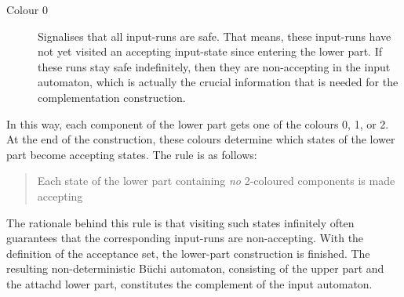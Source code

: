 {\begin{description}


\item[Colour 0]
Signalises that all input-runs are safe. That means, these input-runs have not yet visited an accepting input-state since entering the lower part. If these runs stay safe indefinitely, then they are non-accepting in the input automaton, which is actually the crucial information that is needed for the complementation construction.
\end{description}}

In this way, each component of the lower part gets one of the colours 0, 1, or 2. At the end of the construction, these colours determine which states of the lower part become accepting states. The rule is as follows:

\begin{quote}
\centering
Each state of the lower part containing \textit{no} 2-coloured components is made accepting
\end{quote}

The rationale behind this rule is that visiting such states infinitely often guarantees that the corresponding input-runs are non-accepting. With the definition of the acceptance set, the lower-part construction is finished. The resulting non-deterministic Büchi automaton, consisting of the upper part and the attachd lower part, constitutes the complement of the input automaton.




